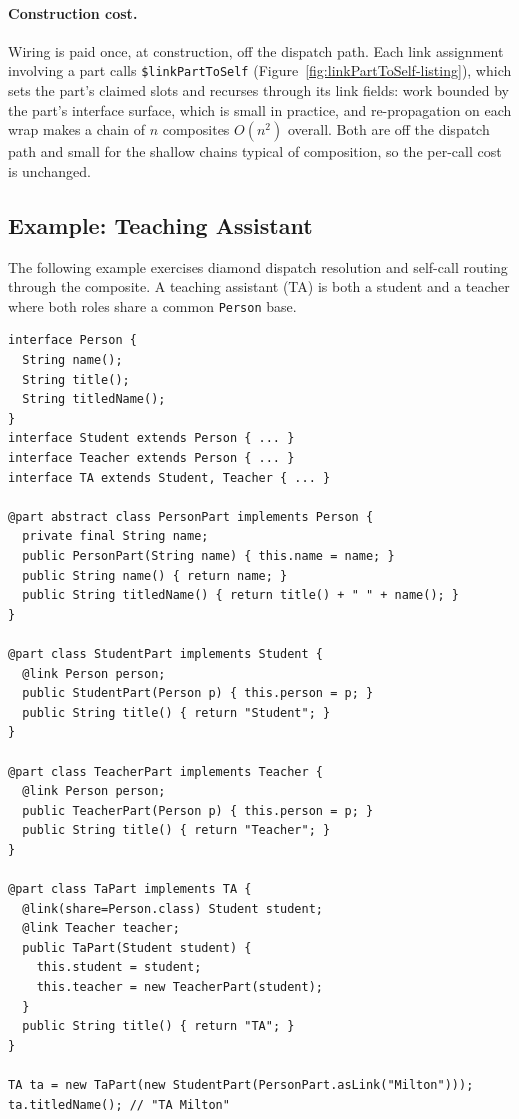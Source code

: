 \documentclass[acmsmall,nonacm]{acmart}
\theoremstyle{acmplain}
\newcommand{\code}[1]{\texttt{#1}}
\begin{document}
\paragraph{Construction cost.}
Wiring is paid once, at construction, off the dispatch path. Each link assignment
involving a part calls \code{\$linkPartToSelf}
(Figure~\ref{fig:linkPartToSelf-listing}), which sets the part's claimed slots and
recurses through its link fields: work bounded by the part's interface surface,
which is small in practice, and re-propagation on each wrap makes a chain of $n$
composites $O(n^2)$ overall. Both are off the dispatch path and small for the
shallow chains typical of composition, so the per-call cost is unchanged.

\subsection{Example: Teaching Assistant}

The following example exercises diamond dispatch resolution and self-call routing through the composite. A teaching assistant (TA)
is both a student and a teacher where both roles share a common \code{Person} base.

\begin{lstlisting}
interface Person {
  String name();
  String title();
  String titledName();
}
interface Student extends Person { ... }
interface Teacher extends Person { ... }
interface TA extends Student, Teacher { ... }

@part abstract class PersonPart implements Person {
  private final String name;
  public PersonPart(String name) { this.name = name; }
  public String name() { return name; }
  public String titledName() { return title() + " " + name(); }
}

@part class StudentPart implements Student {
  @link Person person;
  public StudentPart(Person p) { this.person = p; }
  public String title() { return "Student"; }
}

@part class TeacherPart implements Teacher {
  @link Person person;
  public TeacherPart(Person p) { this.person = p; }
  public String title() { return "Teacher"; }
}

@part class TaPart implements TA {
  @link(share=Person.class) Student student;
  @link Teacher teacher;
  public TaPart(Student student) {
    this.student = student;
    this.teacher = new TeacherPart(student);
  }
  public String title() { return "TA"; }
}

TA ta = new TaPart(new StudentPart(PersonPart.asLink("Milton")));
ta.titledName(); // "TA Milton"
\end{lstlisting}
\end{document}
